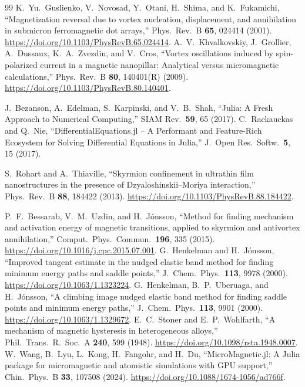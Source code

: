\documentclass{article}      %
\begin{document}
\begin{thebibliography}{99}
 K.\ Yu.\ Guslienko, V.\ Novosad, Y.\ Otani, H.\ Shima,
  and K.\ Fukamichi, ``Magnetization reversal due to vortex nucleation,
  displacement, and annihilation in submicron ferromagnetic dot arrays,''
  Phys.\ Rev.\ B \textbf{65}, 024414 (2001).
  \url{https://doi.org/10.1103/PhysRevB.65.024414}.
 A.\ V.\ Khvalkovskiy, J.\ Grollier, A.\ Dussaux,
  K.\ A.\ Zvezdin, and V.\ Cros, ``Vortex oscillations induced by
  spin-polarized current in a magnetic nanopillar: Analytical versus
  micromagnetic calculations,'' Phys.\ Rev.\ B \textbf{80}, 140401(R) (2009).
  \url{https://doi.org/10.1103/PhysRevB.80.140401}.

 J.\ Bezanson, A.\ Edelman, S.\ Karpinski, and V.\ B.\ Shah,
  ``Julia: A Fresh Approach to Numerical Computing,'' SIAM Rev.\ \textbf{59}, 65
  (2017).
 C.\ Rackauckas and Q.\ Nie, ``DifferentialEquations.jl -- A
  Performant and Feature-Rich Ecosystem for Solving Differential Equations in
  Julia,'' J.\ Open Res.\ Softw.\ \textbf{5}, 15 (2017).

 S.\ Rohart and A.\ Thiaville, ``Skyrmion confinement in
  ultrathin film nanostructures in the presence of Dzyaloshinskii--Moriya
  interaction,'' Phys.\ Rev.\ B \textbf{88}, 184422 (2013).
  \url{https://doi.org/10.1103/PhysRevB.88.184422}.

 P.\ F.\ Bessarab, V.\ M.\ Uzdin, and H.\ J\'onsson, ``Method for
  finding mechanism and activation energy of magnetic transitions, applied to skyrmion
  and antivortex annihilation,'' Comput.\ Phys.\ Commun.\ \textbf{196}, 335 (2015).
  \url{https://doi.org/10.1016/j.cpc.2015.07.001}.
 G.\ Henkelman and H.\ J\'onsson, ``Improved tangent estimate in
  the nudged elastic band method for finding minimum energy paths and saddle points,''
  J.\ Chem.\ Phys.\ \textbf{113}, 9978 (2000). \url{https://doi.org/10.1063/1.1323224}.
 G.\ Henkelman, B.\ P.\ Uberuaga, and H.\ J\'onsson, ``A climbing
  image nudged elastic band method for finding saddle points and minimum energy paths,''
  J.\ Chem.\ Phys.\ \textbf{113}, 9901 (2000). \url{https://doi.org/10.1063/1.1329672}.
 E.\ C.\ Stoner and E.\ P.\ Wohlfarth, ``A mechanism of magnetic
  hysteresis in heterogeneous alloys,'' Phil.\ Trans.\ R.\ Soc.\ A \textbf{240}, 599
  (1948). \url{https://doi.org/10.1098/rsta.1948.0007}.
 W.\ Wang, B.\ Lyu, L.\ Kong, H.\ Fangohr, and H.\ Du,
  ``MicroMagnetic.jl: A Julia package for micromagnetic and atomistic simulations with
  GPU support,'' Chin.\ Phys.\ B \textbf{33}, 107508 (2024).
  \url{https://doi.org/10.1088/1674-1056/ad766f}.


\end{thebibliography}
\end{document}
